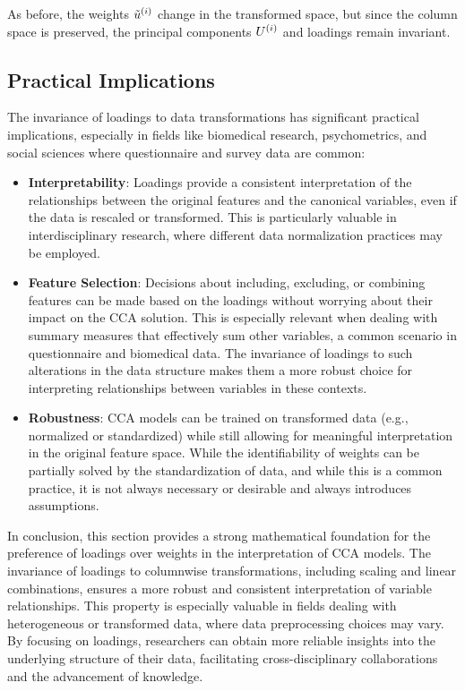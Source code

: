 As before, the weights $\tilde{u}^{(i)}$ change in the transformed space, but since the column space is preserved, the principal components $U^{(i)}$ and loadings remain invariant.

\subsection{Practical Implications}
The invariance of loadings to data transformations has significant practical implications, especially in fields like biomedical research, psychometrics, and social sciences where questionnaire and survey data are common:
\begin{itemize}
    \item \textbf{Interpretability}: Loadings provide a consistent interpretation of the relationships between the original features and the canonical variables, even if the data is rescaled or transformed. This is particularly valuable in interdisciplinary research, where different data normalization practices may be employed.
    \item \textbf{Feature Selection}: Decisions about including, excluding, or combining features can be made based on the loadings without worrying about their impact on the CCA solution. This is especially relevant when dealing with summary measures that effectively sum other variables, a common scenario in questionnaire and biomedical data. The invariance of loadings to such alterations in the data structure makes them a more robust choice for interpreting relationships between variables in these contexts.
    \item \textbf{Robustness}: CCA models can be trained on transformed data (e.g., normalized or standardized) while still allowing for meaningful interpretation in the original feature space. While the identifiability of weights can be partially solved by the standardization of data, and while this is a common practice, it is not always necessary or desirable and always introduces assumptions.
\end{itemize}

In conclusion, this section provides a strong mathematical foundation for the preference of loadings over weights in the interpretation of CCA models. The invariance of loadings to columnwise transformations, including scaling and linear combinations, ensures a more robust and consistent interpretation of variable relationships. This property is especially valuable in fields dealing with heterogeneous or transformed data, where data preprocessing choices may vary. By focusing on loadings, researchers can obtain more reliable insights into the underlying structure of their data, facilitating cross-disciplinary collaborations and the advancement of knowledge.

